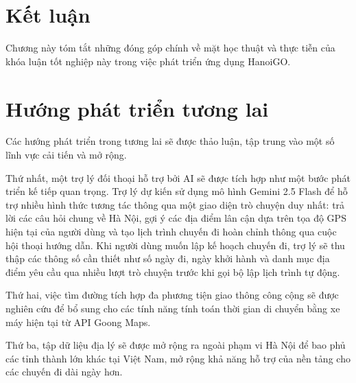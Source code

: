 \documentclass[a4paper,12pt]{report}
\begin{document}
\section{Kết luận}
Chương này tóm tắt những đóng góp chính về mặt học thuật và thực tiễn của khóa luận tốt nghiệp này trong việc phát triển ứng dụng HanoiGO.

\section{Hướng phát triển tương lai}
Các hướng phát triển trong tương lai sẽ được thảo luận, tập trung vào một số lĩnh vực cải tiến và mở rộng.

Thứ nhất, một trợ lý đối thoại hỗ trợ bởi AI sẽ được tích hợp như một bước phát triển kế tiếp quan trọng. Trợ lý dự kiến sử dụng mô hình Gemini 2.5 Flash để hỗ trợ nhiều hình thức tương tác thông qua một giao diện trò chuyện duy nhất: trả lời các câu hỏi chung về Hà Nội, gợi ý các địa điểm lân cận dựa trên tọa độ GPS hiện tại của người dùng và tạo lịch trình chuyến đi hoàn chỉnh thông qua cuộc hội thoại hướng dẫn. Khi người dùng muốn lập kế hoạch chuyến đi, trợ lý sẽ thu thập các thông số cần thiết như số ngày đi, ngày khởi hành và danh mục địa điểm yêu cầu qua nhiều lượt trò chuyện trước khi gọi bộ lập lịch trình tự động.

Thứ hai, việc tìm đường tích hợp đa phương tiện giao thông công cộng sẽ được nghiên cứu để bổ sung cho các tính năng tính toán thời gian di chuyển bằng xe máy hiện tại từ API Goong Maps.

Thứ ba, tập dữ liệu địa lý sẽ được mở rộng ra ngoài phạm vi Hà Nội để bao phủ các tỉnh thành lớn khác tại Việt Nam, mở rộng khả năng hỗ trợ của nền tảng cho các chuyến đi dài ngày hơn.

\newpage
\setlength{\parindent}{15pt}
\setlength{\parskip}{0em}
\linespread{1}\selectfont
\end{document}
